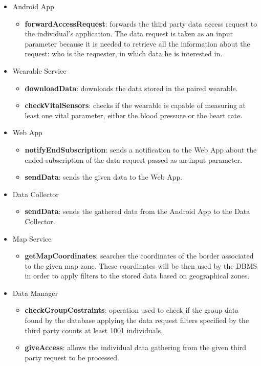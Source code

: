\begin{itemize}
\item Android App
\begin{itemize}
\item \textbf{forwardAccessRequest}: forwards the third party data access request to the individual's application. The data request is taken as an input parameter because it is needed to retrieve all the information about the request: who is the requester, in which data he is interested in.
\end{itemize}
\item Wearable Service
\begin{itemize}
\item \textbf{downloadData}: downloads the data stored in the paired wearable.
\item \textbf{checkVitalSensors}: checks if the wearable is capable of measuring at least one vital parameter, either the blood pressure or the heart rate.
\end{itemize}
\item Web App
\begin{itemize}
\item \textbf{notifyEndSubscription}: sends a notification to the Web App about the ended subscription of the data request passed as an input parameter.
\item \textbf{sendData}: sends the given data to the Web App.
\end{itemize}
\item Data Collector
\begin{itemize}
\item \textbf{sendData}: sends the gathered data from the Android App to the Data Collector.
\end{itemize}
\item Map Service
\begin{itemize}
\item \textbf{getMapCoordinates}: searches the coordinates of the border associated to the given map zone. These coordinates will be then used by the DBMS in order to apply filters to the stored data based on geographical zones.
\end{itemize}
\item Data Manager
\begin{itemize}
\item \textbf{checkGroupCostraints}: operation used to check if the group data found by the database applying the data request filters specified by the third party counts at least 1001 individuals.
\item \textbf{giveAccess}: allows the individual data gathering from the given third party request to be processed.

\end{itemize}
\end{itemize}
